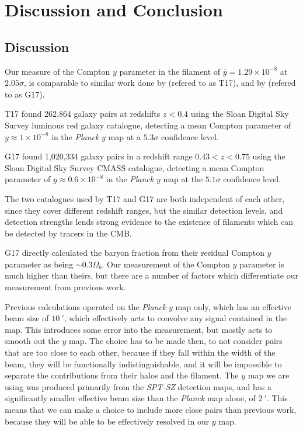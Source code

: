 \chapter{Discussion and Conclusion}

\section{Discussion}
Our measure of the Compton $y$ parameter in the filament of $\bar{y} = 1.29 \times 10^{-8}$ at $2.05 \sigma$, is comparable to similar work done by \cite{2019A&A...625A..67T} (refered to as T17), and by \cite{2019A&A...624A..48D} (refered to as G17).

\par T17 found 262,864 galaxy pairs at redshifts $z<0.4$ using the Sloan Digital Sky Survey luminous red galaxy catalogue, detecting a mean Compton parameter of $y \approx 1 \times 10^{-8}$ in the \emph{Planck} $y$ map at a $5.3\sigma$ confidence level. 

\par G17 found 1,020,334 galaxy pairs in a redshift range $0.43 < z < 0.75$ using the Sloan Digital Sky Survey CMASS catalogue, detecting a mean Compton parameter of $y \approx 0.6 \times 10^{-8}$ in the \emph{Planck} $y$ map at the $5.1\sigma$ confidence level. 

\par The two catalogues used by T17 and G17 are both independent of each other, since they cover different redshift ranges, but the similar detection levels, and detection strengths lends strong evidence to the existence of filaments which can be detected by tracers in the CMB. 

\par G17 directly calculated the baryon fraction from their residual Compton $y$ parameter as being $\sim 0.3 \Omega_b$. Our measurement of the Compton $y$ parameter is much higher than theirs, but there are a number of factors which differentiate our measurement from previous work. 

\par Previous calculations operated on the \emph{Planck} $y$ map only, which has an effective beam size of $\SI{10}{\arcmin}$, which effectively acts to convolve any signal contained in the map. This introduces some error into the measurement, but mostly acts to smooth out the $y$ map. The choice has to be made then, to not consider pairs that are too close to each other, because if they fall within the width of the beam, they will be functionally indistinguishable, and it will be impossible to separate the contributions from their halos and the filament. The $y$ map we are using was produced primarily from the \emph{SPT-SZ} detection maps, and has a significantly smaller effective beam size than the \emph{Planck} map alone, of $\SI{2}{\arcmin}$. This means that we can make a choice to include more close pairs than previous work, because they will be able to be effectively resolved in our $y$ map. 

